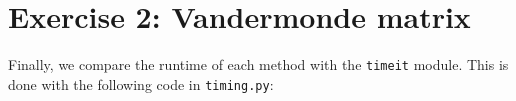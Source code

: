 \section{Exercise 2: Vandermonde matrix}





Finally, we compare the runtime of each method with the \texttt{timeit} module. This is done with the following code in \texttt{timing.py}:




